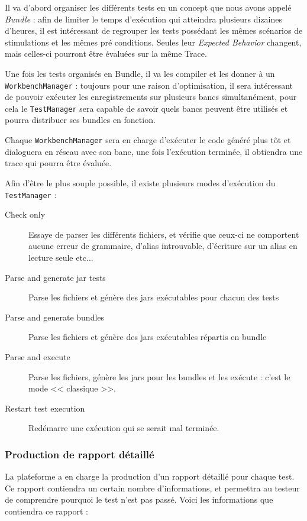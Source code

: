 	Il va d'abord organiser les différents tests en un concept que nous avons appelé \textit{Bundle} : afin de limiter le temps d'exécution qui atteindra plusieurs dizaines d'heures, il est intéressant de regrouper les tests possédant les mêmes scénarios de stimulations et les mêmes pré conditions. Seules leur \textit{Expected Behavior} changent, mais celles-ci pourront être évaluées sur la même Trace.

	Une fois les tests organisés en Bundle, il va les compiler et les donner à un \texttt{WorkbenchManager} : toujours pour une raison d'optimisation, il sera intéressant de pouvoir exécuter les enregistrements sur plusieurs bancs simultanément, pour cela le \texttt{TestManager} sera capable de savoir quels bancs peuvent être utilisés et pourra distribuer ses bundles en fonction. 

	Chaque \texttt{WorkbenchManager} sera en charge d'exécuter le code généré plus tôt et dialoguera en réseau avec son banc, une fois l'exécution terminée, il obtiendra une trace qui pourra être évaluée.

	Afin d'être le plus souple possible, il existe plusieurs modes d'exécution du \texttt{TestManager} : 
	\begin{description}
		\item[Check only] Essaye de parser les différents fichiers, et vérifie que ceux-ci ne comportent aucune erreur de grammaire, d'alias introuvable, d'écriture sur un alias en lecture seule etc...
		\item[Parse and generate jar tests] Parse les fichiers et génère des jars exécutables pour chacun des tests
		\item[Parse and generate bundles] Parse les fichiers et génère des jars exécutables répartis en bundle
		\item[Parse and execute] Parse les fichiers, génère les jars pour les bundles et les exécute : c'est le mode << classique >>.
		\item[Restart test execution] Redémarre une exécution qui se serait mal terminée.
	\end{description}
	\subsubsection{Production de rapport détaillé}\label{report}
	La plateforme a en charge la production d'un rapport détaillé pour chaque test. Ce rapport contiendra un certain nombre d'informations, et permettra au testeur de comprendre pourquoi le test n'est pas passé. Voici les informations que contiendra ce rapport : 

